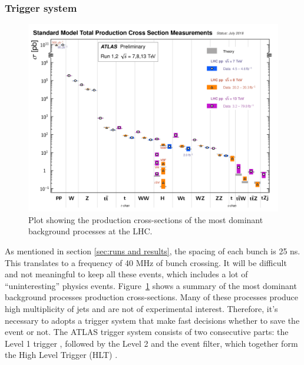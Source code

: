 	\subsubsection{Trigger system}
	\begin{figure}[bht]
		\begin{centering}	
		\includegraphics[width=.97\textwidth]{Detector_plots/summary xs.png}
		\caption{Plot showing the production cross-sections of the most dominant
		background processes at the LHC.}
		\label{fig:summary production Xs}
		\end{centering}
	\end{figure}
	As mentioned in section \ref{sec:runs and results}, the spacing of each bunch
	is 25 ns. This translates to a frequency of 40 MHz of bunch crossing. It
	will be difficult and not meaningful to keep all these events, which includes
	a lot of ``uninteresting'' physics events. Figure~\ref{fig:summary production Xs} 
	shows a summary of the most dominant background processes production cross-sections.
	Many of these processes produce high multiplicity of jets and are not of experimental
	interest. Therefore, it's necessary to adopts a trigger system that make fast decisions
	whether to save the event or not.
	The ATLAS trigger system consists of two consecutive parts: the Level 1 trigger
	\cite{ATLAS-TDR-12}, followed by the Level 2 and the event filter, 
	which together form the High Level Trigger (HLT)
	\cite{ATLAS-TDR-16}.
	
